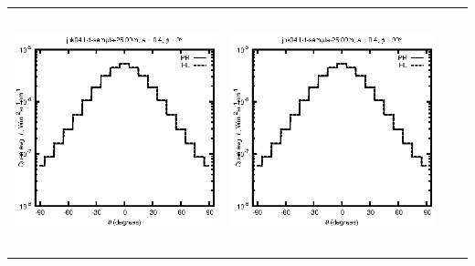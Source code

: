 \documentclass[10pt,a4paper]{article}
\begin{document}
\begin{adjustwidth}{-1.2in}{-1.2in}
\begin{tabular}{c c c c}
\includegraphics[height=7cm]{../eps/jok04_Ld_sample_25.00m_fwd.eps} &
\includegraphics[height=7cm]{../eps/jok04_Ld_sample_25.00m_cross.eps} \\
\end{tabular}

\pagebreak


\end{adjustwidth}
\end{document}

